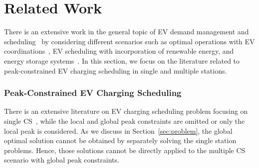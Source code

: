 \documentclass[journal]{IEEEtran}
\newcommand{\revv}[1]{{\color{black}#1}}%
\begin{document}
\section{Related Work}
\label{sec:rel}
\revv{There is an extensive work in the general topic of EV demand management and scheduling~\cite{mukherjee2015review} by considering different scenarios such as optimal operations with EV coordinations~\cite{mukherjee2017distributed}, EV scheduling with incorporation of renewable energy, and energy storage systems~\cite{de2017impact,shafie2018innovative}. In this section, we focus on the literature related to peak-constrained EV charging scheduling in single and multiple stations.}
\subsubsection{Peak-Constrained EV Charging Scheduling}
\label{sec:rel:peakconstrained}			
\revv{There is an extensive literature on EV charging scheduling problem focusing on single CS~\cite{Tang,Wen}, while the local and global peak constraints are omitted or only the local peak is considered.}	As we discuss in Section~\ref{sec:problem}, the global optimal solution cannot be obtained by separately solving the single station problems. Hence, those solutions cannot be directly applied to the multiple CS scenario with global peak constraints. 
\end{document}
